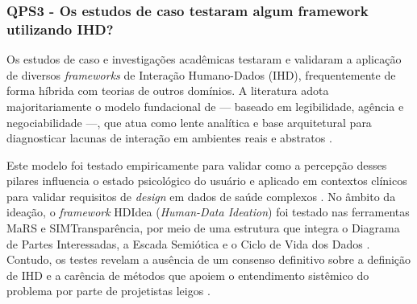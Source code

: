 \documentclass[
	12pt,				%
	oneside,			%
	a4paper,			%
	english,			%
	brazil				%
	]{abntex2ppgsi}
\begin{document}


    \subsubsection{QPS3 - Os estudos de caso testaram algum framework utilizando IHD?}

    Os estudos de caso e investigações acadêmicas testaram e validaram a aplicação de diversos \textit{frameworks} de Interação Humano-Dados (IHD), frequentemente de forma híbrida com teorias de outros domínios. A literatura adota majoritariamente o modelo fundacional de  — baseado em legibilidade, agência e negociabilidade —, que atua como lente analítica e base arquitetural para diagnosticar lacunas de interação em ambientes reais e abstratos \cite{DOWTHWAITE2024, Lenzi2024, Burzio2024, Meechan2023, Victorelli2023Evaluating, Stead2022, Sailaja2021, Lockwood2021, Crabtree2021, Zou2020769, Victorelli2020Human, Locoro2020, Lockwood2020AnAccessible, Strey2019Human}.

    Este modelo foi testado empiricamente para validar como a percepção desses pilares influencia o estado psicológico do usuário e aplicado em contextos clínicos para validar requisitos de \textit{design} em dados de saúde complexos \cite{cezar2023cognitive, sailaja2021exploring}. No âmbito da ideação, o \textit{framework} HDIdea (\textit{Human-Data Ideation}) foi testado nas ferramentas MaRS e SIMTransparência, por meio de uma estrutura que integra o Diagrama de Partes Interessadas, a Escada Semiótica e o Ciclo de Vida dos Dados \cite{Strey2019Human}. Contudo, os testes revelam a ausência de um consenso definitivo sobre a definição de IHD e a carência de métodos que apoiem o entendimento sistêmico do problema por parte de projetistas leigos \cite{Strey2019Human}.
\end{document}
